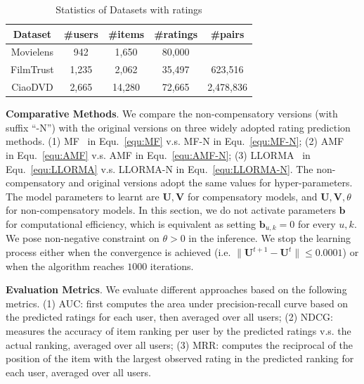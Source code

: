 \documentclass[letterpaper]{article} %
\begin{document}
\begin{table}[htp]
\tiny
\caption{Statistics of Datasets with ratings}
\begin{center}
\begin{tabular}{|c|c|c|c|c|}
\hline
Dataset & \#users & \#items & \#ratings & \#pairs \\\hline
Movielens &942 &1,650 &80,000 &  \\\hline
FilmTrust &1,235 &2,062 &35,497 &623,516 \\\hline
CiaoDVD &2,665 &14,280 &72,665 &2,478,836 \\\hline
\end{tabular}
\end{center}
\label{tab:datasets}
\end{table}
\textbf{Comparative Methods}. We compare the non-compensatory versions (with suffix ``-N'') with the original versions on three widely adopted rating prediction methods. (1) MF~\cite{Koren2009Matrix} in Equ.~\ref{equ:MF} v.s. MF-N in Equ.~\ref{equ:MF-N};  (2) AMF~\cite{Koren2008Factorization} in Equ.~\ref{equ:AMF} v.s. AMF in Equ.~\ref{equ:AMF-N}; (3) LLORMA~\cite{Lee2013Local} in Equ.~\ref{equ:LLORMA} v.s. LLORMA-N in Equ.~\ref{equ:LLORMA-N}. The non-compensatory and original versions adopt the same values for hyper-parameters. The model parameters to learnt are $\mathbf{U},\mathbf{V}$ for compensatory models, and  $\mathbf{U},\mathbf{V},\theta$ for non-compensatory models. In this section, we do not activate parameters $\mathbf{b}$ for computational efficiency, which is equivalent as setting $\mathbf{b}_{u,k}=0$ for every $u,k$. We pose non-negative constraint on $\theta>0$ in the inference. We stop the learning process either when the convergence is achieved (i.e. $\|\mathbf{U}^{t+1}-\mathbf{U}^t\|\leq 0.0001$) or when the algorithm reaches $1000$ iterations.

\textbf{Evaluation Metrics}.  We evaluate different approaches based on the following metrics. (1) AUC: first computes the area under precision-recall curve based on the predicted ratings for each user, then averaged over all users; (2) NDCG: measures the accuracy of item ranking per user by the predicted ratings v.s. the actual ranking, averaged over all users;  (3)  MRR: computes the reciprocal of the position of the item with the largest observed rating in the predicted ranking for each user, averaged over all users. 
\end{document}
